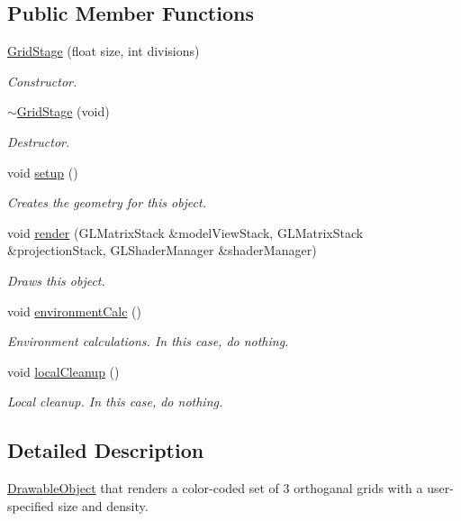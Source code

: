 \subsection*{Public Member Functions}
\begin{DoxyCompactItemize}
\item 
\hyperlink{class_grid_stage_a9bedebe5c2ba147395284982baeea9dd}{Grid\-Stage} (float size, int divisions)
\begin{DoxyCompactList}\small\item\em Constructor. \end{DoxyCompactList}\item 
\hyperlink{class_grid_stage_a607e71170c86459ee29bc1ca69a2ffeb}{$\sim$\-Grid\-Stage} (void)
\begin{DoxyCompactList}\small\item\em Destructor. \end{DoxyCompactList}\item 
void \hyperlink{class_grid_stage_a572c48e4846caace0ace6cf3a6f6c984}{setup} ()
\begin{DoxyCompactList}\small\item\em Creates the geometry for this object. \end{DoxyCompactList}\item 
void \hyperlink{class_grid_stage_a1d97167973141f1a51e395c14c6d9e23}{render} (G\-L\-Matrix\-Stack \&model\-View\-Stack, G\-L\-Matrix\-Stack \&projection\-Stack, G\-L\-Shader\-Manager \&shader\-Manager)
\begin{DoxyCompactList}\small\item\em Draws this object. \end{DoxyCompactList}\item 
void \hyperlink{class_grid_stage_ae5dacfb118998dbfaf781765b4d12886}{environment\-Calc} ()
\begin{DoxyCompactList}\small\item\em Environment calculations. In this case, do nothing. \end{DoxyCompactList}\item 
void \hyperlink{class_grid_stage_a675b8adf2fe787fc4c5313a939b8de52}{local\-Cleanup} ()
\begin{DoxyCompactList}\small\item\em Local cleanup. In this case, do nothing. \end{DoxyCompactList}\end{DoxyCompactItemize}


\subsection{Detailed Description}
\hyperlink{class_drawable_object}{Drawable\-Object} that renders a color-\/coded set of 3 orthoganal grids with a user-\/specified size and density. 

